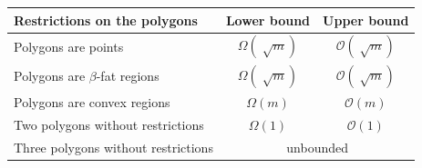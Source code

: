 \documentclass[a4paper, UKenglish]{lipics-v2018}
\newcommand{\mremark}[3]{\textcolor{blue}{\textsc{#1 #2:}} \textcolor{SeaGreen}{\textsf{#3}}}
\newcommand{\jerome}[2][says]{\mremark{J\'er\^ome}{#1}{#2}}
\newcommand{\bigo}{\ensuremath{\mathcal O}}
\begin{document}









\begin{table}[H]
\begin{tabular}{lcc}
\toprule
Restrictions on the polygons & Lower bound & Upper bound  \\ \midrule
Polygons are points & $\Omega(\sqrt[]{m}) $ & $\bigo(\sqrt[]{m})$ \\
Polygons are $\beta$-fat regions & $\Omega(\sqrt[]{m}) $ & $\bigo(\sqrt[]{m})$ \\
Polygons are convex regions & $\Omega(m) $ & $\bigo(m)$ \\
Two polygons without restrictions &  $\Omega(1)$ & $\bigo(1)$\\
Three polygons without restrictions &  \multicolumn{2}{c}{unbounded}\\
\bottomrule
\end{tabular}
\end{table}
\end{document}
